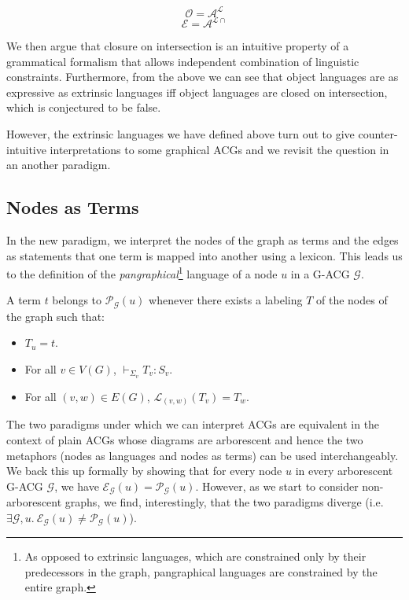 \documentclass{llncs}
\begin{document}
$$
\mathcal{O} = \mathcal{A}^{\mathcal{L}}
$$
$$
\mathcal{E} = \mathcal{A}^{\mathcal{L}{\cap}}
$$

We then argue that closure on intersection is an intuitive property of a
grammatical formalism that allows independent combination of linguistic
constraints. Furthermore, from the above we can see that object languages are
as expressive as extrinsic languages iff object languages are closed on
intersection, which is conjectured to be false.

However, the extrinsic languages we have defined above turn out to give
counter-intuitive interpretations to some graphical ACGs and we revisit the
question in an another paradigm.

\subsection{Nodes as Terms}

In the new paradigm, we interpret the nodes of the graph as terms and the
edges as statements that one term is mapped into another using a lexicon. This
leads us to the definition of the \emph{pangraphical}\footnote{As opposed to
  extrinsic languages, which are constrained only by their predecessors in the
  graph, pangraphical languages are constrained by the entire graph.} language
of a node $u$ in a G-ACG $\mathcal{G}$.

A term $t$ belongs to $\mathcal{P}_{\mathcal{G}}(u)$ whenever there
exists a labeling $T$ of the nodes of the graph such that:

\begin{itemize}
  \item $T_u = t$.
  \item For all $v \in V(G)$, $\vdash_{\Sigma_v} T_v : S_v$.
  \item For all $(v,w) \in E(G)$, $\mathcal{L}_{(v,w)}(T_v) = T_w$.
\end{itemize}

The two paradigms under which we can interpret ACGs are equivalent in the
context of plain ACGs whose diagrams are arborescent and hence the two
metaphors (nodes as languages and nodes as terms) can be used
interchangeably. We back this up formally by showing that for every node $u$
in every arborescent G-ACG $\mathcal{G}$, we have
$\mathcal{E}_{\mathcal{G}}(u) = \mathcal{P}_{\mathcal{G}}(u)$. However, as we
start to consider non-arborescent graphs, we find, interestingly, that the two
paradigms diverge (i.e. $\exists \mathcal{G}, u.\ \mathcal{E}_{\mathcal{G}}(u)
\neq \mathcal{P}_{\mathcal{G}}(u)$).
\end{document}
